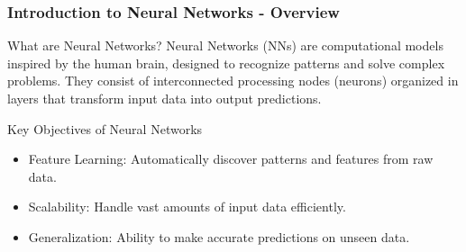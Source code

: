 \documentclass[aspectratio=169]{beamer}
\begin{document}
\frame{\titlepage}

\begin{frame}[fragile]
    \frametitle{Introduction to Neural Networks - Overview}
    \begin{block}{What are Neural Networks?}
        Neural Networks (NNs) are computational models inspired by the human brain, designed to recognize patterns and solve complex problems. They consist of interconnected processing nodes (neurons) organized in layers that transform input data into output predictions.
    \end{block}
    
    \begin{block}{Key Objectives of Neural Networks}
        \begin{itemize}
            \item Feature Learning: Automatically discover patterns and features from raw data.
            \item Scalability: Handle vast amounts of input data efficiently.
            \item Generalization: Ability to make accurate predictions on unseen data.
        \end{itemize}
    \end{block}
\end{frame}
\end{document}
